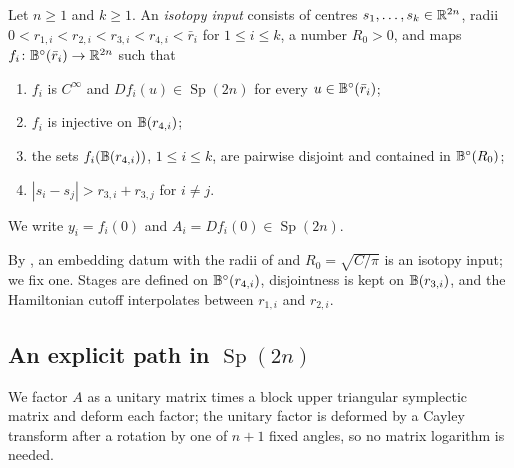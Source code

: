 \begin{definition}\label{def:iso-hyp}
Let $n\ge1$ and $k\ge1$. An \emph{isotopy input} consists of centres $s_1,\dots,s_k\in\mathbb{R}^{2n}$, radii
$0<r_{1,i}<r_{2,i}<r_{3,i}<r_{4,i}<\bar r_i$ for $1\le i\le k$, a number $R_0>0$, and maps
$f_i\colon\mathbb{B}^\circ(\bar r_i)\to\mathbb{R}^{2n}$ such that
\begin{enumerate}[label=(\roman*)]
\item $f_i$ is $C^\infty$ and $Df_i(u)\in\operatorname{Sp}(2n)$ for every $u\in\mathbb{B}^\circ(\bar r_i)$;
\item $f_i$ is injective on $\mathbb{B}(r_{4,i})$;
\item the sets $f_i(\mathbb{B}(r_{4,i}))$, $1\le i\le k$, are pairwise disjoint and contained in $\mathbb{B}^\circ(R_0)$;
\item $|s_i-s_j|>r_{3,i}+r_{3,j}$ for $i\ne j$.
\end{enumerate}
We write $y_i=f_i(0)$ and $A_i=Df_i(0)\in\operatorname{Sp}(2n)$.
\end{definition}

By , an embedding datum with the radii of  and $R_0=\sqrt{C/\pi}$ is an isotopy input; we fix one. Stages are defined on $\mathbb{B}^\circ(r_{4,i})$, disjointness is kept on $\mathbb{B}(r_{3,i})$, and the Hamiltonian cutoff interpolates between $r_{1,i}$ and $r_{2,i}$.

\subsection{An explicit path in $\operatorname{Sp}(2n)$}\label{sec:iso-linear}

We factor $A$ as a unitary matrix times a block upper triangular symplectic matrix and deform each factor; the unitary factor is deformed by a Cayley transform after a rotation by one of $n+1$ fixed angles, so no matrix logarithm is needed.

